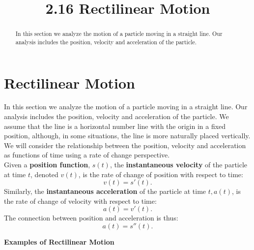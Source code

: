 \documentclass{ximera}
\title{2.16 Rectilinear Motion}
\begin{document}
\begin{abstract}
In this section we analyze the motion of a particle moving in a straight line. Our
analysis includes the position, velocity and acceleration of the particle.
\end{abstract}

\maketitle


\section{Rectilinear Motion}

In this section we analyze the motion of a particle moving in a straight line. Our
analysis includes the position, velocity and acceleration of the particle.
We assume that the line is a horizontal number line with the origin in a fixed position, although, in some situations, 
the line is more naturally placed vertically. We will consider the relationship between the position, 
velocity and acceleration as functions of time using a rate of change perspective. \\
Given a \textbf{position function}, $s(t)$, the \textbf{instantaneous velocity} of the particle at time $t$, 
denoted $v(t)$, is the rate of change of position 
with respect to time:
\[v(t) = s'(t).\]
Similarly, the \textbf{instantaneous acceleration} of the particle at time $t, a(t)$, is the rate of change of 
velocity with respect to time:
\[a(t) = v'(t).\]
The connection between position and acceleration is thus:
\[a(t) = s''(t).\]

\begin{center}
\bf{Examples of Rectilinear Motion}
\end{center}
\end{document}
